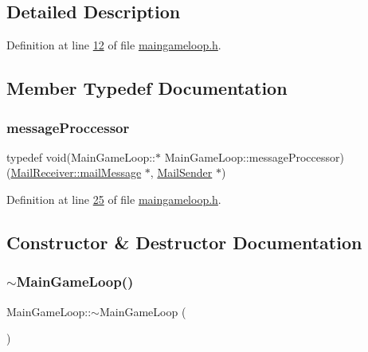 \subsection{Detailed Description}


Definition at line \hyperlink{a00092_source_l00012}{12} of file \hyperlink{a00092_source}{maingameloop.\+h}.



\subsection{Member Typedef Documentation}
\mbox{\label{a00209_a3aecf6efe74a0fe8b40e2d28bf4032ba}} 
\subsubsection{\texorpdfstring{message\+Proccessor}{messageProccessor}}
{\footnotesize\ttfamily typedef void(Main\+Game\+Loop\+::$\ast$ Main\+Game\+Loop\+::message\+Proccessor) (\hyperlink{a00201}{Mail\+Receiver\+::mail\+Message} $\ast$, \hyperlink{a00205}{Mail\+Sender} $\ast$)\hspace{0.3cm}{\ttfamily [private]}}



Definition at line \hyperlink{a00092_source_l00025}{25} of file \hyperlink{a00092_source}{maingameloop.\+h}.



\subsection{Constructor \& Destructor Documentation}
\mbox{\label{a00209_aeeabdbe46a5aeb891d7da7fd9430d0cb}} 
\subsubsection{\texorpdfstring{$\sim$\+Main\+Game\+Loop()}{~MainGameLoop()}}
{\footnotesize\ttfamily Main\+Game\+Loop\+::$\sim$\+Main\+Game\+Loop (\begin{DoxyParamCaption}{ }\end{DoxyParamCaption})}



